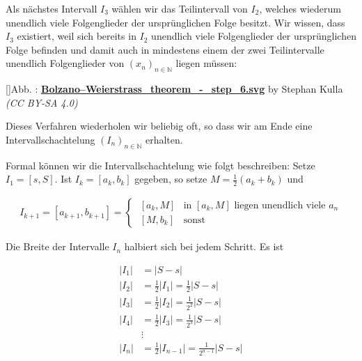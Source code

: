 \documentclass[fontsize=9pt,
               parskip=half-,
               DIV=14,
               listof=chapterentry,
               tocflat]{scrbook}
\newcounter{imagelabel}
\begin{document}
\begin{proof*}
Als nächstes Intervall $I_{3}$ wählen wir das Teilintervall von $I_{2}$, welches wiederum unendlich viele Folgenglieder der ursprünglichen Folge besitzt. Wir wissen, dass $I_{3}$ existiert, weil sich bereits in $I_{2}$ unendlich viele Folgenglieder der ursprünglichen Folge befinden und damit auch in mindestens einem der zwei Teilintervalle unendlich Folgenglieder von $(x_{n})_{n\in \mathbb {N} }$ liegen müssen:

[]{Abb. : \protect\href{https://commons.wikimedia.org/wiki/File:Bolzano–Weierstrass_theorem_-_step_6.svg}{\textbf{Bolzano–Weierstrass\allowbreak\_theorem\allowbreak\_\allowbreak-\allowbreak\_step\allowbreak\_6.svg}} by Stephan Kulla \textit{(CC BY-SA 4.0)}}\begin{center}
\end{center}

Dieses Verfahren wiederholen wir beliebig oft, so dass wir am Ende eine Intervallschachtelung $(I_{n})_{n\in \mathbb {N} }$ erhalten.

Formal können wir die Intervallschachtelung wie folgt beschreiben: Setze $I_{1}=[s,S]$. Ist $I_{k}=[a_{k},b_{k}]$ gegeben, so setze $M={\tfrac {1}{2}}(a_{k}+b_{k})$ und

\begin{align*}
I_{k+1}=[a_{k+1},b_{k+1}]={\begin{cases}\;[a_{k},M]&{\text{in }}[a_{k},M]{\text{ liegen unendlich viele }}a_{n}\\\;[M,b_{k}]&{\text{sonst}}\end{cases}}
\end{align*}

Die Breite der Intervalle $I_{n}$ halbiert sich bei jedem Schritt. Es ist

\begin{align*}
|I_{1}|&=|S-s|\\|I_{2}|&={\frac {1}{2}}|I_{1}|={\frac {1}{2}}|S-s|\\|I_{3}|&={\frac {1}{2}}|I_{2}|={\frac {1}{2^{2}}}|S-s|\\|I_{4}|&={\frac {1}{2}}|I_{3}|={\frac {1}{2^{3}}}|S-s|\\&\vdots \\|I_{n}|&={\frac {1}{2}}|I_{n-1}|={\frac {1}{2^{n-1}}}|S-s|
\end{align*}


\end{proof*}
\end{document}
